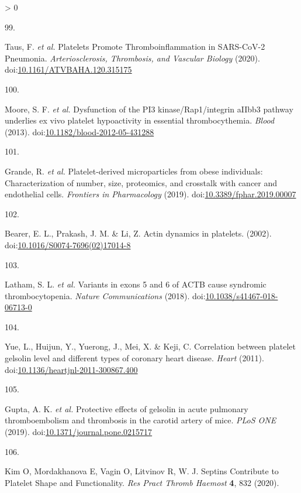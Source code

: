 \documentclass[11pt,twoside]{bristolthesis}
\newlength{\cslhangindent}
\newlength{\csllabelwidth}
\newenvironment{CSLReferences}[2] %
 {%
  \setlength{\parindent}{0pt}
  \ifodd #1 \everypar{\setlength{\hangindent}{\cslhangindent}}\ignorespaces\fi
  \ifnum #2 > 0
  \setlength{\parskip}{#2\baselineskip}
  \fi
 }%
 {}
\newcommand{\CSLLeftMargin}[1]{\parbox[t]{\csllabelwidth}{#1}}
\newcommand{\CSLRightInline}[1]{\parbox[t]{\linewidth - \csllabelwidth}{#1}\break}
\begin{document}
\begin{CSLReferences}{0}{0}
\leavevmode\hypertarget{ref-Taus2020}{}%
\CSLLeftMargin{99. }
\CSLRightInline{Taus, F. \emph{et al.} {Platelets Promote Thromboinflammation in SARS-CoV-2 Pneumonia}. \emph{Arteriosclerosis, Thrombosis, and Vascular Biology} (2020). doi:\href{https://doi.org/10.1161/ATVBAHA.120.315175}{10.1161/ATVBAHA.120.315175}}

\leavevmode\hypertarget{ref-Moore2013}{}%
\CSLLeftMargin{100. }
\CSLRightInline{Moore, S. F. \emph{et al.} {Dysfunction of the PI3 kinase/Rap1/integrin aIIbb3 pathway underlies ex vivo platelet hypoactivity in essential thrombocythemia}. \emph{Blood} (2013). doi:\href{https://doi.org/10.1182/blood-2012-05-431288}{10.1182/blood-2012-05-431288}}

\leavevmode\hypertarget{ref-Grande2019}{}%
\CSLLeftMargin{101. }
\CSLRightInline{Grande, R. \emph{et al.} {Platelet-derived microparticles from obese individuals: Characterization of number, size, proteomics, and crosstalk with cancer and endothelial cells}. \emph{Frontiers in Pharmacology} (2019). doi:\href{https://doi.org/10.3389/fphar.2019.00007}{10.3389/fphar.2019.00007}}

\leavevmode\hypertarget{ref-Bearer2002}{}%
\CSLLeftMargin{102. }
\CSLRightInline{Bearer, E. L., Prakash, J. M. \& Li, Z. {Actin dynamics in platelets}. (2002). doi:\href{https://doi.org/10.1016/S0074-7696(02)17014-8}{10.1016/S0074-7696(02)17014-8}}

\leavevmode\hypertarget{ref-Latham2018}{}%
\CSLLeftMargin{103. }
\CSLRightInline{Latham, S. L. \emph{et al.} {Variants in exons 5 and 6 of ACTB cause syndromic thrombocytopenia}. \emph{Nature Communications} (2018). doi:\href{https://doi.org/10.1038/s41467-018-06713-0}{10.1038/s41467-018-06713-0}}

\leavevmode\hypertarget{ref-Yue2011}{}%
\CSLLeftMargin{104. }
\CSLRightInline{Yue, L., Huijun, Y., Yuerong, J., Mei, X. \& Keji, C. {Correlation between platelet gelsolin level and different types of coronary heart disease}. \emph{Heart} (2011). doi:\href{https://doi.org/10.1136/heartjnl-2011-300867.400}{10.1136/heartjnl-2011-300867.400}}

\leavevmode\hypertarget{ref-Gupta2019}{}%
\CSLLeftMargin{105. }
\CSLRightInline{Gupta, A. K. \emph{et al.} {Protective effects of gelsolin in acute pulmonary thromboembolism and thrombosis in the carotid artery of mice}. \emph{PLoS ONE} (2019). doi:\href{https://doi.org/10.1371/journal.pone.0215717}{10.1371/journal.pone.0215717}}

\leavevmode\hypertarget{ref-Kim2020}{}%
\CSLLeftMargin{106. }
\CSLRightInline{Kim O, Mordakhanova E, Vagin O, Litvinov R, W. J. {Septins Contribute to Platelet Shape and Functionality}. \emph{Res Pract Thromb Haemost} \textbf{4}, 832 (2020).}


\end{CSLReferences}
\end{document}
